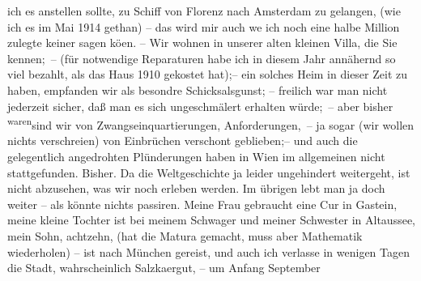 \begin{ledgroupsized}[t]{13cm}
               ich es anstellen sollte, zu Schiff von Florenz
               nach Amsterdam zu gelangen, (wie ich es im
                  Mai 1914 gethan) – das wird mir \introOben{}auch we{\geminationn} ich noch eine halbe Million zulegte\introOben{} keiner
               sagen kö{\geminationn}en. – Wir wohnen  in unserer alten kleinen Villa, die Sie kennen; – (für notwendige
               Reparaturen habe ich in diesem Jahr annähernd so viel bezahlt, als das Haus
                  1910 gekostet hat);– ein solches Heim in dieser Zeit \introOben{}zu\introOben{} haben, empfanden wir als besondre Schicksalsgunst; –
               freilich  war man nicht jederzeit sicher, daß
               man es sich unge{\pb}schmälert erhalten würde; – aber
               bisher \substVorne{}\textsuperscript{waren}\substDazwischen{}sind\substHinten{} wir von Zwangseinquartierungen, Anforderungen, – ja sogar (wir wollen nichts
               verschreien) von Einbrüchen verschont geblieben;– und auch die gelegentlich
               angedrohten Plünderungen haben in Wien im
               allgemeinen nicht stattgefunden. Bisher. Da die Weltgeschichte ja leider ungehindert
               weitergeht, ist nicht abzusehen, was wir noch erleben werden. Im übrigen lebt man ja
               doch weiter – als könnte nichts passiren. Meine Frau gebraucht eine Cur in Gastein, meine kleine Tochter ist bei meinem Schwager und meiner Schwester in Altaussee, mein Sohn, achtzehn, (hat die
               Matura gemacht, muss aber Mathematik wiederholen) – ist nach München gereist, und auch ich verlasse in wenigen Tagen die
               Stadt, wahrschein{\pb}lich Salzka{\geminationm}ergut, – um Anfang September

\end{ledgroupsized}
